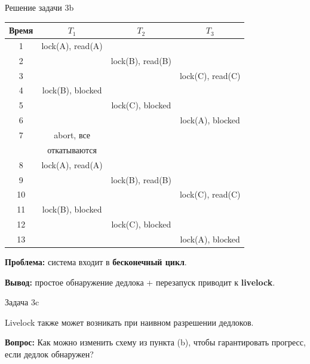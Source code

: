 \documentclass{beamer}
\begin{document}
\begin{frame}{Решение задачи 3b}

\small
\begin{center}
\begin{tabular}{c|c|c|c}
\textbf{Время} & \textbf{$T_1$} & \textbf{$T_2$} & \textbf{$T_3$} \\ \hline
1 & lock(A), read(A) &  &  \\
2 &  & lock(B), read(B) &  \\
3 &  &  & lock(C), read(C) \\
4 & lock(B), blocked &  &  \\
5 &  & lock(C), blocked &  \\
6 &  &  & lock(A), blocked \\
7 & abort, все &  &  \\
    & откатываются &  &  \\
8 & lock(A), read(A) &  &  \\
9 &  & lock(B), read(B) &  \\
10 &  &  & lock(C), read(C) \\
11 & lock(B), blocked &  &  \\
12 &  & lock(C), blocked &  \\
13 &  &  & lock(A), blocked \\
\end{tabular}
\end{center}

\vspace{0.5em}

\textbf{Проблема:} система входит в \textbf{бесконечный цикл}.

\vspace{0.3em}

\textbf{Вывод:} простое обнаружение дедлока + перезапуск приводит к \textbf{livelock}.

\end{frame}

\begin{frame}{Задача 3c}

Livelock также может возникать при наивном разрешении дедлоков.

\vspace{0.7em}

\textbf{Вопрос:}  
Как можно изменить схему из пункта (b), чтобы гарантировать прогресс,
если дедлок обнаружен?

\end{frame}
\end{document}
